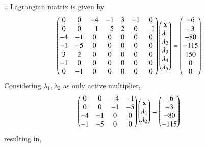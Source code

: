 \documentclass[journal,12pt,twocolumn]{IEEEtran}
\begin{document}
$\therefore$ Lagrangian matrix is given by
\begin{align}
    \begin{pmatrix}0 & 0 & -4 & -1 & 3 & -1 & 0 \\ 0 & 0 & -1 & -5 & 2 & 0 & -1 \\ -4 & -1 & 0 & 0 & 0 & 0 & 0 \\ -1 & -5 & 0 & 0 & 0 & 0 & 0 \\ 3 & 2 & 0 & 0 & 0 & 0 & 0 \\ -1 & 0 & 0 & 0 & 0 & 0 & 0 \\ 0 & -1 & 0 & 0 & 0 & 0 & 0 \end{pmatrix}\begin{pmatrix}\mathbf{x} \\ \lambda_1 \\ \lambda_2 \\ \lambda_3 \\ \lambda_4 \\ \lambda_5 \end{pmatrix} &= \begin{pmatrix}-6 \\ -3 \\ -80 \\ -115 \\ 150 \\ 0 \\0 \end{pmatrix}
\end{align}
Considering $\lambda_1,\lambda_2$ as only active multiplier,
\begin{align}
    \begin{pmatrix}0 & 0 & -4 & -1 \\ 0 & 0 & -1 & -5 \\ -4 & -1 & 0 & 0 \\ -1 & -5 & 0 & 0\end{pmatrix}\begin{pmatrix}\mathbf{x}\\ \lambda_1 \\ \lambda_2\end{pmatrix} &= \begin{pmatrix}-6 \\ -3 \\ -80 \\ -115\end{pmatrix}
\end{align}
resulting in,
\end{document}
